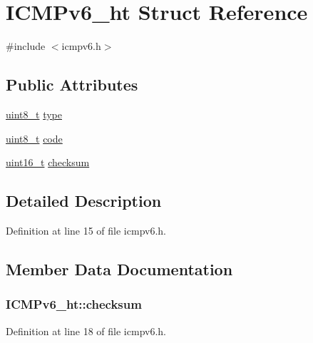 \hypertarget{struct_i_c_m_pv6__ht}{}\section{I\+C\+M\+Pv6\+\_\+ht Struct Reference}
\label{struct_i_c_m_pv6__ht}


{\ttfamily \#include $<$icmpv6.\+h$>$}

\subsection*{Public Attributes}
\begin{DoxyCompactItemize}
\item 
\hyperlink{_p_e___types_8h_aba7bc1797add20fe3efdf37ced1182c5}{uint8\+\_\+t} \hyperlink{struct_i_c_m_pv6__ht_a5d42eb5ccd0b7e69910989cbf76f5da4}{type}
\item 
\hyperlink{_p_e___types_8h_aba7bc1797add20fe3efdf37ced1182c5}{uint8\+\_\+t} \hyperlink{struct_i_c_m_pv6__ht_a00a6e9e2995502d7b2c5e6acd13ba87a}{code}
\item 
\hyperlink{_p_e___types_8h_a1f1825b69244eb3ad2c7165ddc99c956}{uint16\+\_\+t} \hyperlink{struct_i_c_m_pv6__ht_a5fb4b1e50b30271cc7f4b1da0e4c8970}{checksum}
\end{DoxyCompactItemize}


\subsection{Detailed Description}


Definition at line 15 of file icmpv6.\+h.



\subsection{Member Data Documentation}
\subsubsection[{\texorpdfstring{checksum}{checksum}}]{ I\+C\+M\+Pv6\+\_\+ht\+::checksum}\hypertarget{struct_i_c_m_pv6__ht_a5fb4b1e50b30271cc7f4b1da0e4c8970}{}\label{struct_i_c_m_pv6__ht_a5fb4b1e50b30271cc7f4b1da0e4c8970}


Definition at line 18 of file icmpv6.\+h.

